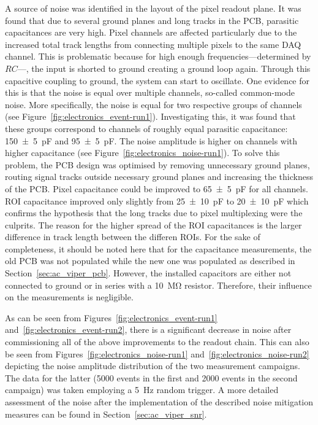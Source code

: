 A source of noise was identified in the layout of the pixel readout plane.
It was found that due to several ground planes and long tracks in the PCB, parasitic capacitances are very high.
Pixel channels are affected particularly due to the increased total track lengths from connecting multiple pixels to the same DAQ channel.
This is problematic because for high enough frequencies---determined by $RC$---, the input is shorted to ground creating a ground loop again.
Through this capacitive coupling to ground, the system can start to oscillate.
One evidence for this is that the noise is equal over multiple channels, so-called common-mode noise.
More specifically, the noise is equal for two respective groups of channels (see Figure~\ref{fig:electronics_event-run1}).
Investigating this, it was found that these groups correspond to channels of roughly equal parasitic capacitance: \SI{150 +- 5}{\pico\farad} and \SI{95 +- 5}{\pico\farad}.
The noise amplitude is higher on channels with higher capacitance (see Figure~\ref{fig:electronics_noise-run1}).
To solve this problem, the PCB design was optimised by removing unnecessary ground planes, routing signal tracks outside necessary ground planes and increasing the thickness of the PCB.
Pixel capacitance could be improved to \SI{65 +- 5}{\pico\farad} for all channels.
ROI capacitance improved only slightly from \SI{25 +- 10}{\pico\farad} to \SI{20 +- 10}{\pico\farad} which confirms the hypothesis that the long tracks due to pixel multiplexing were the culprits.
The reason for the higher spread of the ROI capacitances is the larger difference in track length between the differen ROIs.
For the sake of completeness, it should be noted here that for the capacitance measurements, the old PCB was not populated while the new one was populated as described in Section~\ref{sec:ac_viper_pcb}.
However, the installed capacitors are either not connected to ground or in series with a \SI{10}{\mega\ohm} resistor.
Therefore, their influence on the measurements is negligible.

As can be seen from Figures~\ref{fig:electronics_event-run1} and~\ref{fig:electronics_event-run2}, there is a significant decrease in noise after commissioning all of the above improvements to the readout chain.
This can also be seen from Figures~\ref{fig:electronics_noise-run1} and~\ref{fig:electronics_noise-run2} depicting the noise amplitude distribution of the two measurement campaigns.
The data for the latter (\num{5000} events in the first and \num{2000} events in the second campaign) was taken employing a \SI{5}{\hertz} random trigger.
A more detailed assessment of the noise after the implementation of the described noise mitigation measures can be found in Section~\ref{sec:ac_viper_snr}.

